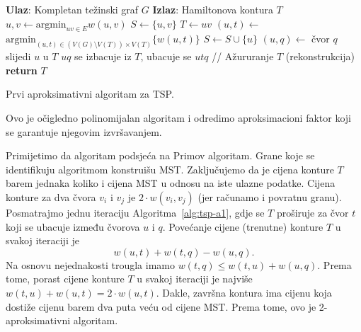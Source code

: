 \documentclass[a4paper, utf8, 11pt, colorlinks]{book}
\theoremstyle{definition}
\begin{document}
   \begin{algorithm}[!t] 
  
  	\begin{algorithmic}[1]
  		\STATE \textbf{Ulaz}: Kompletan težinski graf $G$
  		\STATE \textbf{Izlaz}: Hamiltonova kontura $T$  
  		\STATE $u,v \gets \mbox{argmin}_{uv \in E} w(u,v)$
  		\STATE $S \gets \{u,v\}$
  		\STATE $T \gets uv$
  		\STATE $(u,t) \gets$ $\mbox{argmin}_{(u,t) \in (V(G)\setminus V(T)) \times V(T)} \{w(u, t)\}$
  		\STATE $ S \gets S \cup \{u\}$ 
  		\STATE $(u, q)\gets$ čvor $q$ slijedi $u$ u  $T$
  		\STATE  $uq$ se izbacuje iz $T$, ubacuje se $utq$  // Ažururanje $T$ (rekonstrukcija)
  		\ENDWHILE
  		\STATE \textbf{return} $T$
  	\end{algorithmic}
   	\caption{Prvi aproksimativni algoritam za TSP.}
   	\label{alg:tsp-a1}
  \end{algorithm}

 Ovo je očigledno polinomijalan algoritam i odredimo aproksimacioni faktor koji se garantuje 
njegovim izvršavanjem. 

Primijetimo da algoritam podsjeća na Primov algoritam. Grane koje se identifikuju algoritmom 
konstruišu MST. Zaključujemo da je cijena konture $T$ barem jednaka koliko i cijena MST u odnosu na iste ulazne podatke. Cijena konture za dva čvora $v_i$ i $v_j$ je $2 \cdot w({v_i,v_j})$ (jer računamo i povratnu granu). Posmatrajmo jednu iteraciju Algoritma~\ref{alg:tsp-a1}, gdje se $T$
proširuje za čvor $t$ koji se ubacuje između čvorova  $u$ i $q$. Povećanje cijene (trenutne) konture $T$ u svakoj iteraciji je $$w({u,t}) + w({t,q})-w({u,q}).$$
Na osnovu nejednakosti trougla imamo $ w({t,q}) \leq w({t,u}) + w({u,q})$. Prema tome, porast cijene konture $T$ u svakoj iteraciji je najviše $ w({t, u}) + w({u,t}) = 2\cdot w({u,t})$. 
Dakle, završna kontura ima cijenu koja dostiže cijenu barem dva puta veću od cijene MST. Prema tome, ovo je 2-aproksimativni algoritam. 
\end{document}
